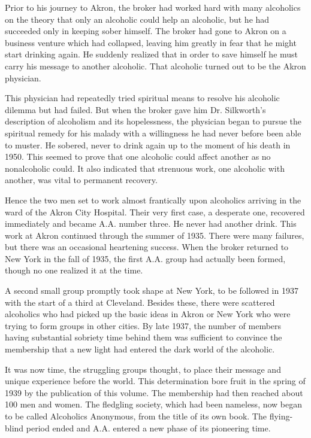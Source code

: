 \begin{biblechapter}
    Prior to his journey to Akron, 
    the broker had worked hard with many alcoholics 
    on the theory that only an alcoholic could help an alcoholic, 
    but he had succeeded only in keeping sober himself. 
\verse The broker had gone to Akron on a business venture 
    which had collapsed, 
    leaving him greatly in fear that he might start drinking again. 
\verse He suddenly realized that in order to save himself 
    he must carry his message to another alcoholic. 
\verse That alcoholic turned out to be the Akron physician.

    This physician had repeatedly tried spiritual means 
    to resolve his alcoholic dilemma but had failed. 
\verse But when the broker gave him Dr. Silkworth’s description 
    of alcoholism and its hopelessness, 
    the physician began to pursue the spiritual remedy for his malady 
    with a willingness he had never before been able to muster.
\verse He sobered, never to drink again 
    up to the moment of his death in 1950. 
\verse This seemed to prove that one alcoholic could affect another 
    as no nonalcoholic could. %
\verse It also indicated that strenuous work, 
    one alcoholic with another, 
    was vital to permanent recovery.

    Hence the two men set to work almost frantically 
    upon alcoholics arriving in the ward of the Akron City Hospital. 
\verse Their very first case, a desperate one, 
    recovered immediately and became A.A. number three.
\verse He never had another drink.
\verse This work at Akron continued through the summer of 1935.
\verse There were many failures, 
    but there was an occasional heartening success.
\verse When the broker returned to New York in the fall of 1935, 
    the first A.A. group had actually been formed, 
    though no one realized it at the time.


    A second small group promptly took shape at New York, 
    to be followed in 1937 with the start of a third at Cleveland. 
\verse Besides these, there were scattered alcoholics 
    who had picked up the basic ideas in Akron or New York 
    who were trying to form groups in other cities. 
\verse By late 1937, 
    the number of members having substantial sobriety time behind them 
    was sufficient to convince the membership that 
    a new light had entered the dark world of the alcoholic.

    It was now time, the struggling groups thought, 
    to place their message and unique experience before the world. 
\verse This determination bore fruit in the spring of 1939 
    by the publication of this volume. 
\verse The membership had then reached about 100 men and women. 
\verse The fledgling society, 
    which had been nameless, 
    now began to be called Alcoholics Anonymous, 
    from the title of its own book. 
\verse The flying-blind period ended 
    and A.A. entered a new phase of its pioneering time.


\end{biblechapter}
